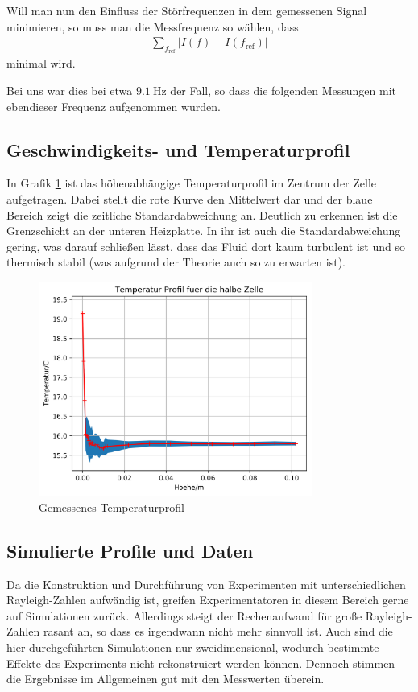 \documentclass[12pt,a4paper,titlepage,headinclude]{scrartcl}
\numberwithin{equation}{subsection}
\begin{document}
Will man nun den Einfluss der Störfrequenzen in dem gemessenen Signal minimieren, so muss man die Messfrequenz so wählen, dass
\begin{align}
  \sum_{f_\text{ref}} |I(f)-I(f_\text{ref})|
\end{align}
minimal wird.

Bei uns war dies bei etwa $\SI{9.1}\hertz$ der Fall, so dass die folgenden Messungen mit ebendieser Frequenz aufgenommen wurden.

\subsection{Geschwindigkeits- und Temperaturprofil}
\label{sec:profile}
In Grafik \ref{fig:T_fahrt} ist das höhenabhängige Temperaturprofil im Zentrum der Zelle aufgetragen.
Dabei stellt die rote Kurve den Mittelwert dar und der blaue Bereich zeigt die zeitliche Standardabweichung an.
Deutlich zu erkennen ist die Grenzschicht an der unteren Heizplatte.
In ihr ist auch die Standardabweichung gering, was darauf schließen lässt, dass das Fluid dort kaum turbulent ist und so thermisch stabil (was aufgrund der Theorie auch so zu erwarten ist).
\begin{figure}[!ht]
\centering
\includegraphics[width=0.8\textwidth]{T_fahrt.png}
\caption{Gemessenes Temperaturprofil}
\label{fig:T_fahrt}
\end{figure}


\subsection{Simulierte Profile und Daten}
Da die Konstruktion und Durchf\"uhrung von Experimenten mit unterschiedlichen Rayleigh-Zahlen aufw\"andig ist, greifen Experimentatoren in diesem Bereich gerne auf Simulationen zur\"uck.
Allerdings steigt der Rechenaufwand f\"ur gro{\ss}e Rayleigh-Zahlen rasant an, so dass es irgendwann nicht mehr sinnvoll ist.
Auch sind die hier durchgef\"uhrten Simulationen nur zweidimensional, wodurch bestimmte Effekte des Experiments nicht rekonstruiert werden k\"onnen.
Dennoch stimmen die Ergebnisse im Allgemeinen gut mit den Messwerten \"uberein.\\
\end{document}
